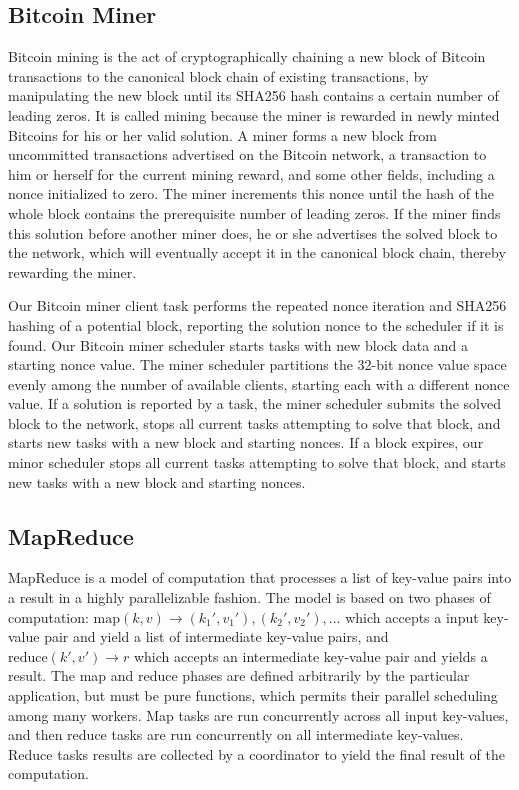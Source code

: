 \documentclass [11pt, twocolumn] {article}
\begin{document}
\subsection {Bitcoin Miner}

Bitcoin mining is the act of cryptographically chaining a new block of Bitcoin transactions to the canonical block chain of existing transactions, by manipulating the new block until its SHA256 hash contains a certain number of leading zeros. It is called mining because the miner is rewarded in newly minted Bitcoins for his or her valid solution. A miner forms a new block from uncommitted transactions advertised on the Bitcoin network, a transaction to him or herself for the current mining reward, and some other fields, including a nonce initialized to zero. The miner increments this nonce until the hash of the whole block contains the prerequisite number of leading zeros. If the miner finds this solution before another miner does, he or she advertises the solved block to the network, which will eventually accept it in the canonical block chain, thereby rewarding the miner.

Our Bitcoin miner client task performs the repeated nonce iteration and SHA256 hashing of a potential block, reporting the solution nonce to the scheduler if it is found. Our Bitcoin miner scheduler starts tasks with new block data and a starting nonce value. The miner scheduler partitions the 32-bit nonce value space evenly among the number of available clients, starting each with a different nonce value. If a solution is reported by a task, the miner scheduler submits the solved block to the network, stops all current tasks attempting to solve that block, and starts new tasks with a new block and starting nonces. If a block expires, our minor scheduler stops all current tasks attempting to solve that block, and starts new tasks with a new block and starting nonces.

\subsection {MapReduce} 

MapReduce is a model of computation that processes a list of key-value pairs into a result in a highly parallelizable fashion. The model is based on two phases of computation: $\text{map}(k, v) \rightarrow ({k_1}',{v_1}'), ({k_2}', {v_2}'), \ldots $ which accepts a input key-value pair and yield a list of intermediate key-value pairs, and $\text{reduce}(k', v') \rightarrow r$ which accepts an intermediate key-value pair and yields a result. The map and reduce phases are defined arbitrarily by the particular application, but must be pure functions, which permits their parallel scheduling among many workers. Map tasks are run concurrently across all input key-values, and then reduce tasks are run concurrently on all intermediate key-values. Reduce tasks results are collected by a coordinator to yield the final result of the computation.
\end{document}
